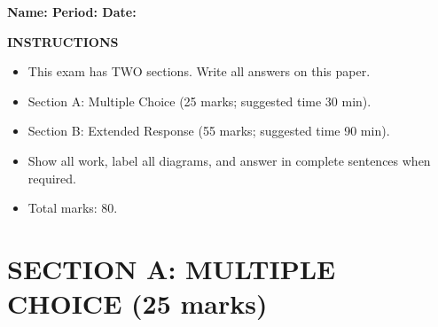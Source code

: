 \documentclass[12pt,letterpaper]{exam}
\begin{document}
  
  
\begin{center}  
  \large\bfseries  
  Name: \underline{\hspace{2.5in}} \quad Period: \underline{\hspace{0.5in}} \quad Date: \underline{\hspace{1in}}  
\end{center}  
  
\vspace{0.2in}  
\noindent\textbf{INSTRUCTIONS}  
\begin{itemize}  
  \item This exam has TWO sections. Write all answers on this paper.  
  \item Section A: Multiple Choice (25 marks; suggested time 30 min).  
  \item Section B: Extended Response (55 marks; suggested time 90 min).  
  \item Show all work, label all diagrams, and answer in complete sentences when required.  
  \item Total marks: 80.  
\end{itemize}  
  
\renewcommand{\questionlabel}{\thequestion.}  
\renewcommand{\choiceshook}{\setlength{\itemsep}{6pt}}  
  
\section*{SECTION A: MULTIPLE CHOICE (25 marks)}  
  
\end{document}
